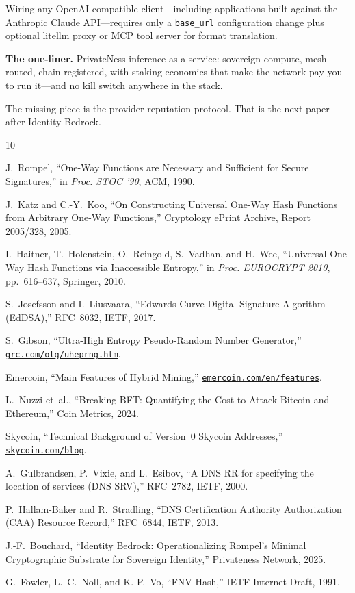 \documentclass[11pt,a4paper]{article}
\begin{document}
Wiring any OpenAI-compatible client—including applications built against the Anthropic Claude API—requires only a \texttt{base\_url} configuration change plus optional litellm proxy or MCP tool server for format translation.

\begin{notebox}
\textbf{The one-liner.} PrivateNess inference-as-a-service: sovereign compute, mesh-routed, chain-registered, with staking economics that make the network pay you to run it—and no kill switch anywhere in the stack.
\end{notebox}

The missing piece is the provider reputation protocol. That is the next paper after Identity Bedrock.

\begin{thebibliography}{10}

J.~Rompel, ``One-Way Functions are Necessary and Sufficient for Secure Signatures,'' in \textit{Proc. STOC '90}, ACM, 1990.

J.~Katz and C.-Y.~Koo, ``On Constructing Universal One-Way Hash Functions from Arbitrary One-Way Functions,'' Cryptology ePrint Archive, Report 2005/328, 2005.

I.~Haitner, T.~Holenstein, O.~Reingold, S.~Vadhan, and H.~Wee, ``Universal One-Way Hash Functions via Inaccessible Entropy,'' in \textit{Proc. EUROCRYPT 2010}, pp.~616--637, Springer, 2010.

S.~Josefsson and I.~Liusvaara, ``Edwards-Curve Digital Signature Algorithm (EdDSA),'' RFC~8032, IETF, 2017.

S.~Gibson, ``Ultra-High Entropy Pseudo-Random Number Generator,'' \href{https://www.grc.com/otg/uheprng.htm}{\texttt{grc.com/otg/uheprng.htm}}.

Emercoin, ``Main Features of Hybrid Mining,'' \href{https://emercoin.com/en/features}{\texttt{emercoin.com/en/features}}.

L.~Nuzzi et~al., ``Breaking BFT: Quantifying the Cost to Attack Bitcoin and Ethereum,'' Coin Metrics, 2024.

Skycoin, ``Technical Background of Version~0 Skycoin Addresses,'' \href{https://www.skycoin.com/blog}{\texttt{skycoin.com/blog}}.

A.~Gulbrandsen, P.~Vixie, and L.~Esibov, ``A DNS RR for specifying the location of services (DNS SRV),'' RFC~2782, IETF, 2000.

P.~Hallam-Baker and R.~Stradling, ``DNS Certification Authority Authorization (CAA) Resource Record,'' RFC~6844, IETF, 2013.

J.-F.~Bouchard, ``Identity Bedrock: Operationalizing Rompel's Minimal Cryptographic Substrate for Sovereign Identity,'' Privateness Network, 2025.

G.~Fowler, L.~C.~Noll, and K.-P.~Vo, ``FNV Hash,'' IETF Internet Draft, 1991.

\end{thebibliography}
\end{document}
